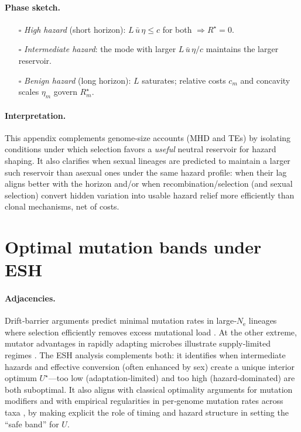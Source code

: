 \documentclass[11pt]{article}
\theoremstyle{upright}
\newcommand{\Ne}{N_{\mathrm{e}}}
\begin{document}
\paragraph{Phase sketch.}
\begin{itemize}
\item[$\square$] \emph{High hazard} (short horizon): $L\,\bar u\,\eta\le c$ for both $\Rightarrow R^\star=0$.
\item[$\square$] \emph{Intermediate hazard}: the mode with larger $L\,\bar u\,\eta/c$ maintains the larger reservoir.
\item[$\square$] \emph{Benign hazard} (long horizon): $L$ saturates; relative costs $c_m$ and concavity scales $\eta_m$ govern $R^\star_m$.
\end{itemize}

\paragraph{Interpretation.}
This appendix complements genome-size accounts (MHD and TEs) by isolating conditions under which selection favors a \emph{useful} neutral reservoir for hazard shaping. It also clarifies when sexual lineages are predicted to maintain a larger such reservoir than asexual ones under the same hazard profile: when their lag aligns better with the horizon and/or when recombination/selection (and sexual selection) convert hidden variation into usable hazard relief more efficiently than clonal mechanisms, net of costs.

\section{Optimal mutation bands under ESH}
\label{app:mut-bands}

\paragraph{Adjacencies.}
Drift‐barrier arguments predict minimal mutation rates in large‐\(\Ne\) lineages where selection efficiently removes excess mutational load \citep{Lynch2010}. At the other extreme, mutator advantages in rapidly adapting microbes illustrate supply‐limited regimes \citep{Sniegowski2010}. The ESH analysis complements both: it identifies when intermediate hazards and effective conversion (often enhanced by sex) create a unique interior optimum \(U^\star\)---too low (adaptation‐limited) and too high (hazard‐dominated) are both suboptimal. It also aligns with classical optimality arguments for mutation modifiers \citep{Leigh1970} and with empirical regularities in per‐genome mutation rates across taxa \citep{Drake1998}, by making explicit the role of timing and hazard structure in setting the ``safe band'' for \(U\).
\end{document}
